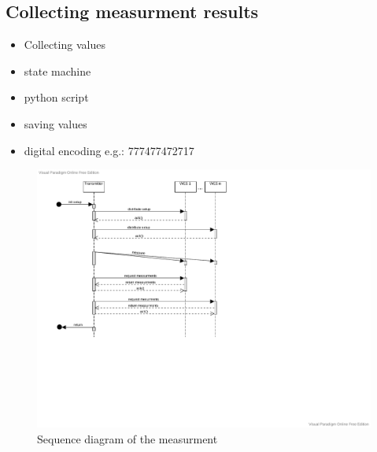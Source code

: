 
\subsection{Collecting measurment results}
\begin{itemize}
\item Collecting values
\item state machine
\item python script
\item saving values
\item digital encoding e.g.: 777477472717
\end{itemize}

\begin{figure}
	\includegraphics[scale=0.8]{figures/sequence_diagram.pdf}
	\caption{Sequence diagram of the measurment}
	\label{fig:sequenceDiagram}
\end{figure}

